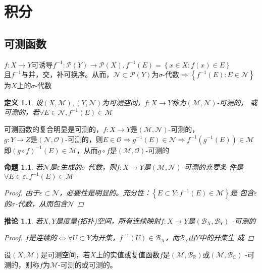 \documentclass[12pt, a4paper, oneside]{ctexbook}
\newtheorem{definition}[theorem]{定义}
\newtheorem{corollary}[theorem]{推论}
\newtheorem{proposition}[theorem]{命题}
\begin{document}
\chapter{积分}

\section{可测函数}
$f:X\to Y$可诱导$f^{-1}:\mathcal{P}(Y)\to\mathcal{P}(X),f^{-1}(E)=\left\{x\in X:f(x)\in E\right\}$\\
且$f^{-1}$与并，交，补可换序。从而，$\mathcal{N}\subset\mathcal{P}(Y)$为$\sigma$-代数$\Rightarrow\left\{f^{-1}(E):E\in\mathcal{N}\right\}$
为$X$上的$\sigma$-代数
\begin{definition}
    设$(X,\mathcal{M}),(Y,\mathcal{N})$为可测空间，$f:X\to Y$称为$(\mathcal{M},\mathcal{N})$-可测的，
    或可测的，若$\forall E\in\mathcal{N},f^{-1}(E)\in\mathcal{M}$
\end{definition}
可测函数的复合明显是可测的，$f:X\to Y$是$(\mathcal{M},\mathcal{N})$-可测的，\\
$g:Y\to Z$是$(\mathcal{N},\mathcal{O})$-可测的，则$E\in\mathcal{O}\Rightarrow g^{-1}(E)\in\mathcal{N}\Rightarrow f^{-1}(g^{-1}(E))\in\mathcal{M}$\\
即$(g\circ f)^{-1}(E)\in\mathcal{M}$，从而$g\circ f$是$(\mathcal{M},\mathcal{O})$-可测的
\begin{proposition}
    若$\mathcal{N}$是$\varepsilon$生成的$\sigma$-代数，则$f:X\to Y$是$(\mathcal{M},\mathcal{N})$-可测的充要条
    件是$\forall E\in\varepsilon,f^{-1}(E)\in\mathcal{M}$
    \begin{proof}
        由于$\varepsilon\subset\mathcal{N}$，必要性是明显的。充分性：$\left\{E\subset Y:f^{-1}(E)\in\mathcal{M}\right\}$是
        包含$\varepsilon$的$\sigma$-代数，从而包含$\mathcal{N}$
    \end{proof}
\end{proposition}
\begin{corollary}
    若$X,Y$是度量(拓扑)空间，所有连续映射$f:X\to Y$是$(\mathcal{B}_{X},\mathcal{B}_{Y})$
    -可测的
    \begin{proof}
        $f$是连续的$\Leftrightarrow\forall U\subset Y$为开集，$f^{-1}(U)\in\mathcal{B}_X$，而$\mathcal{B}_Y$由$Y$中的开集生
        成
    \end{proof}
\end{corollary}
设$(X,\mathcal{M})$是可测空间，若$X$上的实值或复值函数$f$是$(\mathcal{M},\mathcal{B}_{\mathbb{R}})$或$(\mathcal{M},\mathcal{B}_{\mathbb{C}})$
-可测的，则称$f$为$\mathcal{M}$-可测的或可测的。
\end{document}
